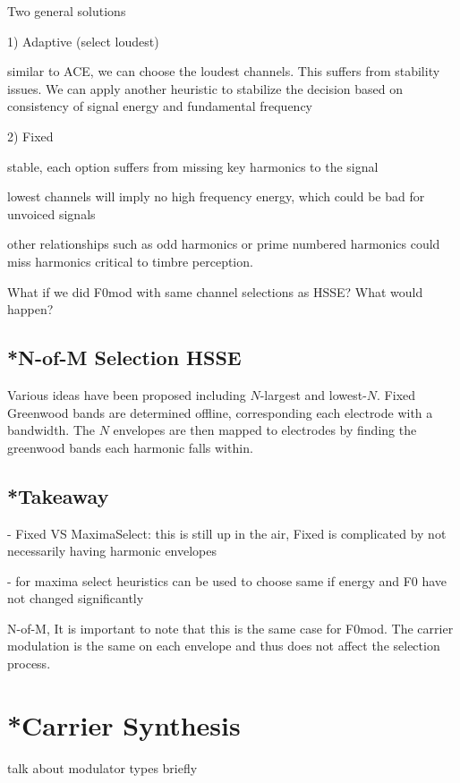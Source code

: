 \documentclass [11pt, proquest] {uwthesis}[2015/03/03]
\begin{document}
Two general solutions

1) Adaptive (select loudest)

similar to ACE, we can choose the loudest channels.  This suffers from stability issues.  We can apply another heuristic to stabilize the decision based on consistency of signal energy and fundamental frequency

2) Fixed

stable, each option suffers from missing key harmonics to the signal

lowest channels will imply no high frequency energy, which could be bad for unvoiced signals

other relationships such as odd harmonics or prime numbered harmonics could miss harmonics critical to timbre perception.

What if we did F0mod with same channel selections as HSSE?  What would happen?

\subsection{*N-of-M Selection HSSE}

Various ideas have been proposed including $N$-largest and lowest-$N$.  Fixed Greenwood bands are determined offline, corresponding each electrode with a bandwidth.  The $N$ envelopes are then mapped to electrodes by finding the greenwood bands each harmonic falls within.


\subsection{*Takeaway}

 - Fixed VS MaximaSelect: this is still up in the air, Fixed is complicated by not necessarily having harmonic envelopes
 
 - for maxima select heuristics can be used to choose same if energy and F0 have not changed significantly
 


N-of-M, It is important to note that this is the same case for F0mod.  The carrier modulation is the same on each envelope and thus does not affect the selection process.
 
 


\section{*Carrier Synthesis}

talk about modulator types briefly
\end{document}
